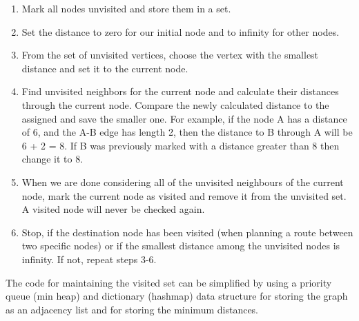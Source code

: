 \documentclass{article}
\begin{document}
    \begin{enumerate}
        \item Mark all nodes unvisited and store them in a set.
        
        \item Set the distance to zero for our initial node and to infinity for other nodes.

        \item From the set of unvisited vertices, choose the vertex with the smallest distance and set it to the current node.
        
        \item Find unvisited neighbors for the current node and calculate their distances through the current node. Compare the newly calculated distance to the assigned and save the smaller one. 
        For example, if the node A has a distance of 6, and the A-B edge has length 2, then the distance to B through A will be 6 + 2 = 8. If B was previously marked with a distance greater than 8 then change it to 8.

        \item When we are done considering all of the unvisited neighbours of the current node, mark the current node as visited and remove it from the unvisited set. A visited node will never be checked again.
        
        \item Stop, if the destination node has been visited (when planning a route between two specific nodes) or if the smallest distance among the unvisited nodes is infinity. If not, repeat steps 3-6.
    \end{enumerate}
    
    The code for maintaining the visited set can be simplified by using a priority queue (min heap) and dictionary (hashmap) data structure for storing the graph as an adjacency list and for storing the minimum distances.
    
\end{document}
